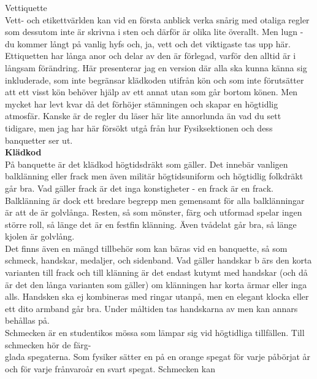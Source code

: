 \documentclass[a6paper,12pt]{article}
\begin{document}
\newpage


\newpage
\setlength{\oddsidemargin}{-0.57in}
\noindent %
\Large Vettiquette\\
\footnotesize Vett- och etikettvärlden kan vid en första anblick verka 
snårig med otaliga regler som dessutom inte är skrivna i sten och 
därför är olika lite överallt. Men lugn - du kommer långt på vanlig 
hyfs och, ja, vett och det viktigaste tas upp här. Ettiquetten har 
långa anor och delar av den är förlegad, varför den alltid är i 
långsam förändring. Här presenterar jag en version där alla ska kunna 
känna sig inkluderade, som inte begränsar klädkoden utifrån kön och 
som inte förutsätter att ett visst kön behöver hjälp av ett annat 
utan som går bortom könen. Men mycket har levt kvar då det förhöjer 
stämningen och skapar en högtidlig atmosfär. Kanske är de regler du läser 
här lite annorlunda än vad du sett tidigare, men jag har här försökt 
utgå från hur Fysiksektionen och dess banquetter ser ut.\\
\normalsize\textbf{Klädkod}\\
\footnotesize På banquette är det klädkod högtidsdräkt som gäller. 
Det innebär vanligen balklänning eller frack men även militär högtidsuniform 
och högtidlig folkdräkt går bra. Vad gäller frack är det inga konstigheter 
- en frack är en frack. Balklänning är dock ett bredare begrepp men 
gemensamt för alla balklänningar är att de är golvlånga. Resten, så 
som mönster, färg och utformad spelar ingen större roll, så länge det 
är en festfin klänning. Även tvådelat går bra, så länge kjolen är golvlång.\\
Det finns även en mängd tillbehör som kan bäras vid en banquette, 
så som schmeck, handskar, medaljer, och sidenband. Vad gäller handskar b
ärs den korta 
\newpage
\setlength{\oddsidemargin}{-0.37in}
\noindent
varianten till frack och till klänning är det endast kutymt med handskar 
(och då är det den långa varianten som gäller) om klänningen har korta 
ärmar eller inga alls. Handsken ska ej kombineras med ringar utanpå, 
men en elegant klocka eller ett dito armband går bra. Under måltiden 
tas handskarna av men kan annars behållas på.\\
Schmecken är en studentikos mössa som lämpar sig vid högtidliga 
tillfällen. Till schmecken hör de färg-\\
glada spegaterna. Som fysiker sätter en på en orange spegat för 
varje påbörjat år och för varje frånvaroår en svart spegat. Schmecken kan 
\end{document}
